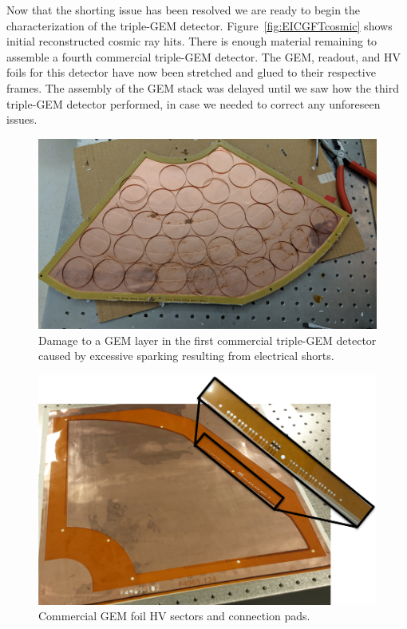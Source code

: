 Now that the shorting issue has been resolved we are ready to begin the characterization of the triple-GEM detector. Figure~\ref{fig:EICGFTcosmic} shows initial reconstructed cosmic ray hits.
There is enough material remaining to assemble a fourth commercial triple-GEM detector. The GEM, readout, and HV foils for this detector have now been stretched and glued to their respective frames. The assembly of the GEM stack was delayed until we saw how the third triple-GEM detector performed, in case we needed to correct any unforeseen issues.

\begin{figure}
\center
\includegraphics[width=\columnwidth]{TU_plots/GEM-spark.jpg}
\caption{\label{fig:spark}Damage to a GEM layer in the first commercial triple-GEM detector caused by excessive sparking resulting from electrical shorts.}
\end{figure}


\begin{figure}
\center
\includegraphics[width=\columnwidth]{TU_plots/GEM-HVPad.png}
\caption{\label{fig:EICFGT} Commercial GEM foil HV sectors and connection pads.}
\end{figure}

